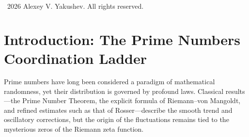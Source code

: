 \documentclass[12pt,a4paper]{article}
\theoremstyle{remark}
\newcommand{\Keff}{K_{\mathrm{eff}}}
\begin{document}
\begin{titlepage}
\begin{center}
\begin{abstract}
				\textbf{Part II} extends this framework to particle physics, demonstrating that the inverse fine-structure constant \(\alpha^{-1} \approx 137.036\) and the \(W\)-boson mass \(m_W \approx 80.4\) GeV are not accidental empirical parameters but direct projections of the same coordination lattice. Using the YUCT algebraic constants (\(S_{\mathrm{odd}} = 6/5\), \(S_{\mathrm{even}} = 4/5\), \(\beta = 2/3\), \(q = (3/2)^{1/3}\), \(\sigma = 0.20\)) and the experimentally measured \(\Keff \approx 1.4995\) from our million-digit benchmark, we derive:
				\begin{align}
					\alpha^{-1} &= \frac{1}{\beta} \left( \pi^4 + \frac{e^3 \cdot S_{\mathrm{odd}}}{q \cdot S_{\mathrm{even}}} \right) - \sigma \approx 137.036, \\
					m_W &= M_{\mathrm{base}} \left( \Keff \cdot \ln(\alpha^{-1}) + \frac{S_{\mathrm{even}}}{\beta} \right) \approx 80.4\ \text{GeV}.
				\end{align}
				
				Both predictions agree with experimental values to within \(<0.1\%\). This establishes a rigorous isomorphism between the vacuum lattice of prime numbers and the spectrum of elementary particles, confirming that physical reality is a coordinated execution of a static numerical dictionary.
				
				Ready-to-use Python scripts implementing the full navigation core are publicly available on GitHub.
			\end{abstract}
			
			\vspace{0.5cm}
			\noindent\textcopyright\ 2026 Alexey V. Yakushev. All rights reserved.
		\end{center}
	\end{titlepage}
	
	\tableofcontents
	\newpage
	
	
	\section{Introduction: The Prime Numbers Coordination Ladder}
	\label{sec:intro}
	
	Prime numbers have long been considered a paradigm of mathematical randomness, yet their distribution is governed by profound laws. Classical results---the Prime Number Theorem, the explicit formula of Riemann--von Mangoldt, and refined estimates such as that of Rosser---describe the smooth trend and oscillatory corrections, but the origin of the fluctuations remains tied to the mysterious zeros of the Riemann zeta function.
	
\end{document}
